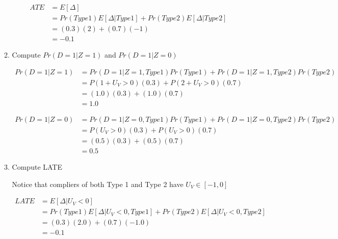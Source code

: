 \documentclass{article}
\begin{document}
\begin{enumerate}
\begin{enumerate}
\begin{align*}
ATE 
&= E[\Delta]\\
&= Pr(Type 1) E[\Delta | Type 1] + Pr(Type 2) E[\Delta | Type 2] \\
&= (0.3) (2) + (0.7) (-1) \\
&= -0.1
\end{align*}

\item Compute $Pr(D=1 | Z = 1)$ and $Pr(D=1 | Z = 0)$

\begin{align*}
Pr(D=1 | Z = 1)
&= Pr(D=1 | Z = 1, Type 1)Pr(Type 1) + Pr(D=1 | Z = 1, Type 2)Pr(Type 2) \\
&= P(1+ U_V > 0)(0.3) + P(2+ U_V > 0)(0.7) \\
&= (1.0)(0.3) + (1.0)(0.7) \\
&= 1.0
\end{align*}

\begin{align*}
Pr(D=1 | Z = 0)
&= Pr(D=1 | Z = 0, Type 1)Pr(Type 1) + Pr(D=1 | Z = 0, Type 2)Pr(Type 2) \\
&= P(U_V > 0)(0.3) + P(U_V > 0)(0.7) \\
&= (0.5)(0.3) + (0.5)(0.7) \\
&= 0.5
\end{align*}

\pagebreak

\item Compute LATE

Notice that compliers of both Type 1 and Type 2 have $U_V \in [-1, 0]$

\begin{align*}
LATE 
&= E[\Delta | U_V < 0]\\
&= Pr(Type 1) E[\Delta | U_V < 0, Type 1] + Pr(Type 2) E[\Delta | U_V < 0, Type 2]\\
&= (0.3)(2.0) + (0.7)(-1.0)\\
&= -0.1
\end{align*}

\end{enumerate}
\end{enumerate}
\end{document}
